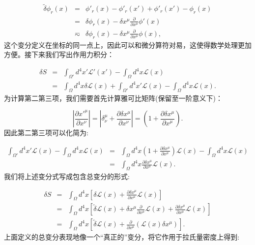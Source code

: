 \documentclass[10pt,UTF8]{ctexart}
\begin{document}
\begin{eqnarray}
\tilde{\delta}\phi_{r}\left(x\right) & = & \phi'_{r}\left(x\right)-\phi'_{r}\left(x'\right)+\phi'_{r}\left(x'\right)-\phi_{r}\left(x\right)\nonumber \\
 & = & \delta\phi_{r}\left(x\right)-\delta x^{\mu}\frac{\partial}{\partial x^{\mu}}\phi'\left(x\right)\nonumber \\
 & \eqsim & \delta\phi_{r}\left(x\right)-\delta x^{\mu}\frac{\partial}{\partial x^{\mu}}\phi\left(x\right),
\end{eqnarray}
这个变分定义在坐标的同一点上，因此可以和微分算符对易，这使得数学处理更加方便。接下来我们写出作用力积分： 

\begin{eqnarray}
\delta S & = & \int_{\Omega'}d^{4}x'\mathcal{L}'\left(x'\right)-\int_{\Omega}d^{4}x\mathcal{L}\left(x\right)\nonumber \\
 & = & \int_{\Omega}d^{4}x\delta\mathcal{L}\left(x\right)+\int_{\Omega'}d^{4}x'\mathcal{L}\left(x\right)-\int_{\Omega}d^{4}x\mathcal{L}\left(x\right).
\end{eqnarray}
为计算第二第三项，我们需要首先计算雅可比矩阵(保留至一阶意义下)： 

\begin{equation}
\left|\frac{\partial x'^{\mu}}{\partial x^{\nu}}\right|=\left|\delta_{\nu}^{\mu}+\frac{\partial\delta x^{\mu}}{\partial x^{\nu}}\right|=\left(1+\frac{\partial\delta x^{\mu}}{\partial x^{\mu}}\right).
\end{equation}
因此第二第三项可以化简为: 

\begin{eqnarray}
\int_{\Omega'}d^{4}x'\mathcal{L}\left(x\right)-\int_{\Omega}d^{4}x\mathcal{L}\left(x\right) & = & \int_{\Omega}d^{4}x\left(1+\frac{\partial\delta x^{\mu}}{\partial x^{\mu}}\right)\mathcal{L}\left(x\right)-\int_{\Omega}d^{4}x\mathcal{L}\left(x\right)\nonumber \\
 & = & \int_{\Omega}d^{4}x\frac{\partial\delta x^{\mu}}{\partial x^{\mu}}\mathcal{L}\left(x\right).
\end{eqnarray}
我们将上述变分式写成包含总变分的形式: 

\begin{eqnarray}
\delta S & = & \int_{\Omega}d^{4}x\left[\delta\mathcal{L}\left(x\right)+\frac{\partial\delta x^{\mu}}{\partial x^{\mu}}\mathcal{L}\left(x\right)\right]\nonumber \\
 & = & \int_{\Omega}d^{4}x\left[\tilde{\delta}\mathcal{L}\left(x\right)+\delta x^{\mu}\frac{\partial}{\partial x^{\mu}}\mathcal{L}\left(x\right)+\frac{\partial\delta x^{\mu}}{\partial x^{\mu}}\mathcal{L}\left(x\right)\right]\nonumber \\
 & = & \int_{\Omega}d^{4}x\left[\tilde{\delta}\mathcal{L}\left(x\right)+\frac{\partial}{\partial x^{\mu}}\left(\mathcal{L}\left(x\right)\delta x^{\mu}\right)\right].
\end{eqnarray}
上面定义的总变分表现地像一个“真正的”变分，将它作用于拉氏量密度上得到: 
\end{document}
